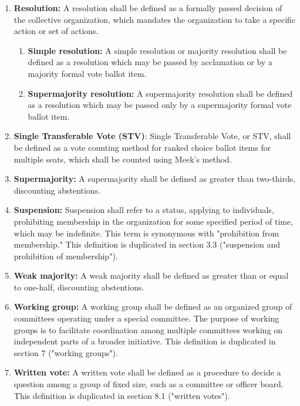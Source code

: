 \documentclass[11pt]{article}
\newcounter{h1}
\newcounter{h2}[h1]
\newcounter{h3}[h2]
\begin{document}
\begin{enumerate}
  \item \textbf{Resolution:} A resolution shall be defined as a formally passed decision of the collective organization, which mandates the organization to take a specific action or set of actions.
  \begin{enumerate}
    \item \textbf{Simple resolution:} A simple resolution or majority resolution shall be defined as a resolution which may be passed by acclamation or by a majority formal vote ballot item.
    \item \textbf{Supermajority resolution:} A supermajority resolution shall be defined as a resolution which may be passed only by a supermajority formal vote ballot item.
  \end{enumerate}
  \item \textbf{Single Transferable Vote (STV)}: Single Transferable Vote, or STV, shall be defined as a vote counting method for ranked choice ballot items for multiple seats, which shall be counted using Meek's method.
  \item \textbf{Supermajority:} A supermajority shall be defined as greater than two-thirds, discounting abstentions.
  \item \textbf{Suspension:} Suspension shall refer to a status, applying to individuals, prohibiting membership in the organization for some specified period of time, which may be indefinite. This term is synonymous with "prohibition from membership." This definition is duplicated in section 3.3 ("suspension and prohibition of membership").
  \item \textbf{Weak majority:} A weak majority shall be defined as greater than or equal to one-half, discounting abstentions.
  \item \textbf{Working group:} A working group shall be defined as an organized group of committees operating under a special committee. The purpose of working groups is to facilitate coordination among multiple committees working on independent parts of a broader initiative. This definition is duplicated in section 7 ("working groups").
  \item \textbf{Written vote:} A written vote shall be defined as a procedure to decide a question among a group of fixed size, such as a committee or officer board. This definition is duplicated in section 8.1 ("written votes").
\end{enumerate}


\end{document}

